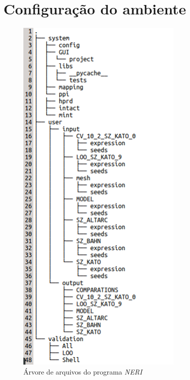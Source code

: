 \chapter{Configuração do ambiente}
\label{appendice_ambient}

\begin{figure}[ht!]
\centering
\includegraphics[width=80mm]{Images/tree.png}
\caption {Árvore de arquivos do programa \textsl{NERI}
\label{tree_files}}
\end{figure}

